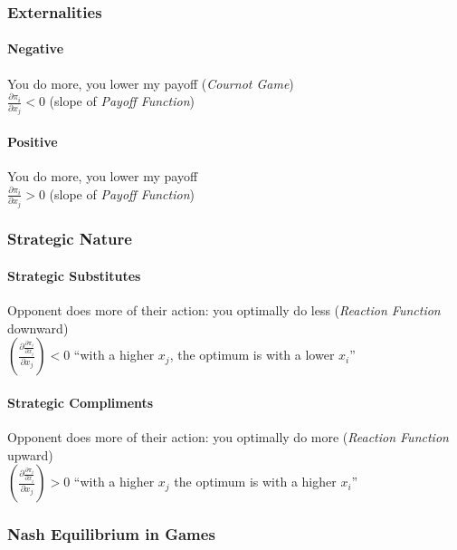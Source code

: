 \documentclass[11pt, english]{article}
\begin{document}
		\subsubsection{Externalities}

		\paragraph{Negative}

	You do more, you lower my payoff (\textit{Cournot Game})\\
	$\frac{\partial \pi_i}{\partial x_j}<0$ (slope of \textit{Payoff Function})

		\paragraph{Positive}

	You do more, you lower my payoff\\
	$\frac{\partial \pi_i}{\partial x_j}>0$ (slope of \textit{Payoff Function})

		\subsubsection{Strategic Nature}

		\paragraph{Strategic Substitutes}

	Opponent does more of their action: you optimally do less (\textit{Reaction Function} downward)\\
	$\left(\frac{\partial\frac{\partial \pi_i}{\partial x_i}}{\partial x_j}\right)<0$ ``with a higher $x_j$, the optimum is with a lower $x_i$''

		\paragraph{Strategic Compliments}
	
	Opponent does more of their action: you optimally do more (\textit{Reaction Function} upward)\\
	$\left(\frac{\partial\frac{\partial \pi_i}{\partial x_i}}{\partial x_j}\right)>0$ ``with a higher $x_j$ the optimum is with a higher $x_i$''

		\subsubsection{Nash Equilibrium in Games}
\end{document}
